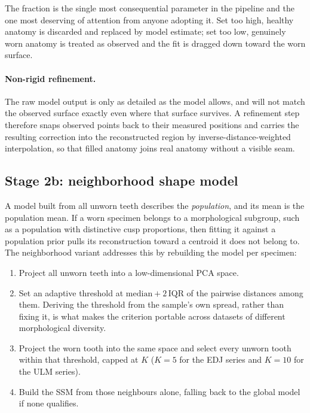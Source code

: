 \documentclass[10pt,a4paper,twocolumn]{article}
\begin{document}
The fraction is the single most
consequential parameter in the pipeline and the one most deserving of attention
from anyone adopting it. Set too high, healthy anatomy is discarded and replaced
by model estimate; set too low, genuinely worn anatomy is treated as observed and
the fit is dragged down toward the worn surface.

\paragraph{Non-rigid refinement.}
The raw model output is only as detailed as the model allows, and will not match
the observed surface exactly even where that surface survives. A refinement step
therefore snaps observed points back to their measured positions and carries the
resulting correction into the reconstructed region by inverse-distance-weighted
interpolation, so that filled anatomy joins real anatomy without a visible seam.

\subsection{Stage 2b: neighborhood shape model}
\label{sec:nbr}

A model built from all unworn teeth describes the \emph{population}, and its mean
is the population mean. If a worn specimen belongs to a morphological subgroup,
such as a population with distinctive cusp proportions, then fitting it against
a population prior pulls its reconstruction toward a centroid it does not belong
to. The neighborhood variant addresses this by rebuilding the model per specimen:

\begin{enumerate}
  \item Project all unworn teeth into a low-dimensional PCA space.
  \item Set an adaptive threshold at $\mathrm{median} + 2\,\mathrm{IQR}$ of the
        pairwise distances among them. Deriving the threshold from the sample's
        own spread, rather than fixing it, is what makes the criterion portable
        across datasets of different morphological diversity.
  \item Project the worn tooth into the same space and select every unworn tooth
        within that threshold, capped at $K$ ($K=5$ for the EDJ series and
        $K=10$ for the ULM series).
  \item Build the SSM from those neighbours alone, falling back to the global
        model if none qualifies.
\end{enumerate}
\end{document}
